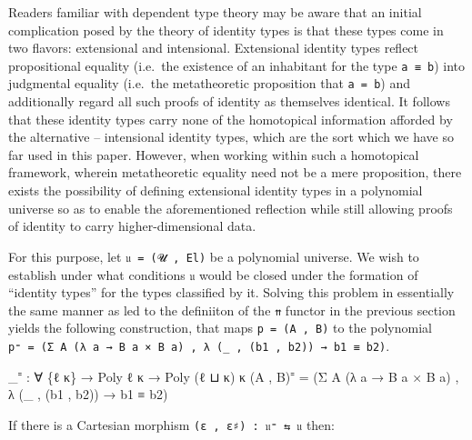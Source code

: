 \documentclass[
  11pt,
  oneside,
  article]{memoir}
\newenvironment{Shaded}{}{}
\newcommand{\NormalTok}[1]{#1}
\newcommand{\OtherTok}[1]{\textcolor[rgb]{0.00,0.44,0.13}{#1}}
\theoremstyle{definition}
\theoremstyle{plain}
\newcommand{\0}{\textsf{0}}
\newcommand{\1}{\tn{\textsf{1}}}
\begin{document}
Readers familiar with dependent type theory may be aware that an initial
complication posed by the theory of identity types is that these types
come in two flavors: extensional and intensional. Extensional identity
types reflect propositional equality (i.e.~the existence of an
inhabitant for the type \texttt{a\ ≡\ b}) into judgmental equality
(i.e.~the metatheoretic proposition that \texttt{a\ =\ b}) and
additionally regard all such proofs of identity as themselves identical.
It follows that these identity types carry none of the homotopical
information afforded by the alternative -- intensional identity types,
which are the sort which we have so far used in this paper. However,
when working within such a homotopical framework, wherein metatheoretic
equality need not be a mere proposition, there exists the possibility of
defining extensional identity types in a polynomial universe so as to
enable the aforementioned reflection while still allowing proofs of
identity to carry higher-dimensional data.

For this purpose, let \texttt{𝔲\ =\ (𝓤\ ,\ El)} be a polynomial
universe. We wish to establish under what conditions \texttt{𝔲} would be
closed under the formation of ``identity types'' for the types
classified by it. Solving this problem in essentially the same manner as
led to the definiiton of the \texttt{⇈} functor in the previous section
yields the following construction, that maps \texttt{p\ =\ (A\ ,\ B)} to
the polynomial
\texttt{p⁼\ =\ (Σ\ A\ (λ\ a\ →\ B\ a\ ×\ B\ a)\ ,\ λ\ (\_\ ,\ (b1\ ,\ b2))\ →\ b1\ ≡\ b2)}.

\begin{Shaded}
\begin{Highlighting}[]
\OtherTok{\_}\NormalTok{⁼ }\OtherTok{:} \OtherTok{∀} \OtherTok{\{}\NormalTok{ℓ κ}\OtherTok{\}} \OtherTok{→}\NormalTok{ Poly ℓ κ }\OtherTok{→}\NormalTok{ Poly }\OtherTok{(}\NormalTok{ℓ ⊔ κ}\OtherTok{)}\NormalTok{ κ}
\OtherTok{(}\NormalTok{A , B}\OtherTok{)}\NormalTok{⁼ }\OtherTok{=} \OtherTok{(}\NormalTok{Σ A }\OtherTok{(λ}\NormalTok{ a }\OtherTok{→}\NormalTok{ B a × B a}\OtherTok{)}\NormalTok{ , }\OtherTok{λ} \OtherTok{(\_}\NormalTok{ , }\OtherTok{(}\NormalTok{b1 , b2}\OtherTok{))} \OtherTok{→}\NormalTok{ b1 ≡ b2}\OtherTok{)}
\end{Highlighting}
\end{Shaded}

If there is a Cartesian morphism \texttt{(ε\ ,\ ε♯)\ :\ 𝔲⁼\ ⇆\ 𝔲} then:
\end{document}
